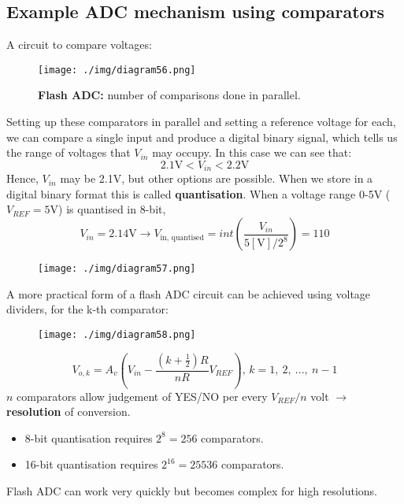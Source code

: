 \subsection{Example ADC mechanism using comparators}
A circuit to compare voltages:
\begin{figure}[H]
  \centering
  \texttt{[image: ./img/diagram56.png]}
  \caption{\textbf{Flash ADC:} number of comparisons done in parallel.}
\end{figure}
Setting up these comparators in parallel and setting a reference voltage for each, we can compare a single input and produce a digital binary signal, which tells us the range of voltages that $V_{in}$ may occupy. In this case we can see that:
\begin{equation}
  2.1 \si{\volt} < V_{in} < 2.2 \si{\volt}
\end{equation}
Hence, $V_{in}$ may be 2.1\si{\volt}, but other options are possible. When we store in a digital binary format this is called \textbf{quantisation}. When a voltage range 0-5\si{\volt} ($V_{REF} = 5\si{\volt}$) is quantised in 8-bit,
\begin{equation}
  V_{in} = 2.14\si{\volt} \rightarrow V_{\textrm{in, quantised}} = int \left(\frac{V_{in}}{5[\si{\volt}]/2^8}\right) = 110
\end{equation}
\begin{figure}[H]
  \centering
  \texttt{[image: ./img/diagram57.png]}
\end{figure}
A more practical form of a flash ADC circuit can be achieved using voltage dividers, for the k-th comparator:
\begin{figure}[H]
  \centering
  \texttt{[image: ./img/diagram58.png]}
\end{figure}
\begin{equation}
  V_{o, k} = A_v \left(V_{in} - \frac{\left(k + \frac{1}{2}\right)R}{nR} V_{REF}\right) \textrm{, } k = 1, \ 2, \ ..., \ n-1
\end{equation}
$n$ comparators allow judgement of YES/NO per every $V_{REF} / n$ volt $\rightarrow$ \textbf{resolution} of conversion.
\begin{itemize}
  \item 8-bit quantisation requires $2^8 = 256$ comparators.
  \item 16-bit quantisation requires $2^{16} = 25536$ comparators.
\end{itemize}
Flash ADC can work very quickly but becomes complex for high resolutions.
